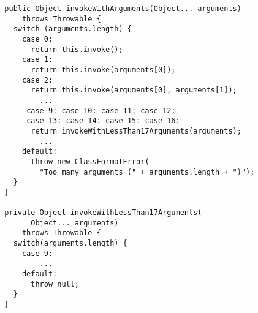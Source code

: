 {\scriptsize \begin{verbatim}
  public Object invokeWithArguments(Object... arguments)
      throws Throwable {
    switch (arguments.length) {
      case 0:
        return this.invoke();
      case 1:
        return this.invoke(arguments[0]);
      case 2:
        return this.invoke(arguments[0], arguments[1]);
          ...
       case 9: case 10: case 11: case 12:
       case 13: case 14: case 15: case 16:
        return invokeWithLessThan17Arguments(arguments);
          ...
      default:
        throw new ClassFormatError(
          "Too many arguments (" + arguments.length + ")");
    }
  }

  private Object invokeWithLessThan17Arguments(
        Object... arguments)
      throws Throwable {
    switch(arguments.length) {
      case 9:
          ...
      default:
        throw null;
    }
  }
\end{verbatim} }

